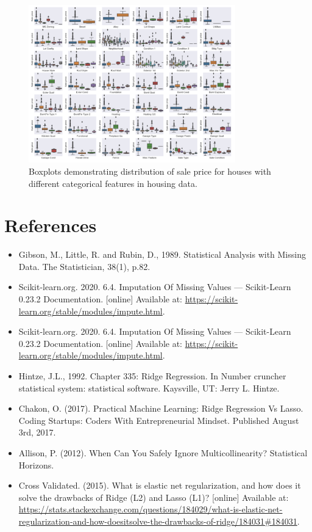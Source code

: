 \documentclass[letterpaper,12pt,twoside,]{pinp}
\providecommand{\tightlist}{%
  \setlength{\itemsep}{0pt}\setlength{\parskip}{0pt}}
\begin{document}
\begin{figure}[h]
\includegraphics[width=0.8\textwidth]{boxplot.png}
\centering
\caption{Boxplots demonstrating distribution of sale price for houses with different categorical features in housing data.}
\label{fig:boxplots}
\end{figure}

\newpage

\hypertarget{references}{%
\section{References}\label{references}}

\begin{itemize}
\tightlist
\item
  Gibson, M., Little, R. and Rubin, D., 1989. Statistical Analysis with
  Missing Data. The Statistician, 38(1), p.82.
\item
  Scikit-learn.org. 2020. 6.4. Imputation Of Missing Values ---
  Scikit-Learn 0.23.2 Documentation. {[}online{]} Available at:
  \url{https://scikit-learn.org/stable/modules/impute.html}.
\item
  Scikit-learn.org. 2020. 6.4. Imputation Of Missing Values ---
  Scikit-Learn 0.23.2 Documentation. {[}online{]} Available at:
  \url{https://scikit-learn.org/stable/modules/impute.html}.
\item
  Hintze, J.L., 1992. Chapter 335: Ridge Regression. In Number cruncher
  statistical system: statistical software. Kaysville, UT: Jerry L.
  Hintze.
\item
  Chakon, O. (2017). Practical Machine Learning: Ridge Regression Vs
  Lasso. Coding Startups: Coders With Entrepreneurial Mindset. Published
  August 3rd, 2017.
\item
  Allison, P. (2012). When Can You Safely Ignore Multicollinearity?
  Statistical Horizons.
\item
  Cross Validated. (2015). What is elastic net regularization, and how
  does it solve the drawbacks of Ridge (L2) and Lasso (L1)? {[}online{]}
  Available at:
  \url{https://stats.stackexchange.com/questions/184029/what-is-elastic-net-regularization-and-how-doesitsolve-the-drawbacks-of-ridge/184031\#184031}.
\end{itemize}
\end{document}
